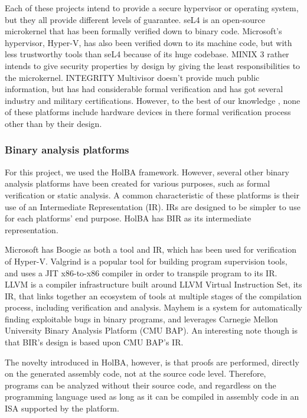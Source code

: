 \documentclass[10pt,a4paper]{article}
\begin{document}
\begin{multicols}{2}
Each of these projects intend to provide a secure hypervisor or operating system, but they all provide different levels of guarantee. seL4 is an open-source microkernel that has been formally verified down to binary code. Microsoft's hypervisor, Hyper-V, has also been verified down to its machine code, but with less trustworthy tools than seL4 because of its huge codebase. MINIX 3 rather intends to give security properties by design by giving the least responsibilities to the microkernel. INTEGRITY Multivisor doesn't provide much public information, but has had considerable formal verification and has got several industry and military certifications. However, to the best of our knowledge , none of these platforms include hardware devices in there formal verification process other than by their design.

\subsubsection{Binary analysis platforms}

For this project, we used the {HolBA} framework. However, several other binary analysis platforms have been created for various purposes, such as formal verification or static analysis. A common characteristic of these platforms is their use of an Intermediate Representation ({IR}). IRs are designed to be simpler to use for each platforms' end purpose. HolBA has BIR as its intermediate representation.

Microsoft has Boogie as both a tool and IR, which has been used for verification of {Hyper\nobreakdash-\hspace{0pt}V}. Valgrind is a popular tool for building program supervision tools, and uses a JIT x86-to-x86 compiler in order to transpile program to its IR. LLVM is a compiler infrastructure built around LLVM Virtual Instruction Set, its {IR}, that links together an ecosystem of tools at multiple stages of the compilation process, including verification and analysis. Mayhem is a system for automatically finding exploitable bugs in binary programs, and leverages Carnegie Mellon University Binary Analysis Platform (CMU BAP). An interesting note though is that BIR's design is based upon CMU BAP's IR.

The novelty introduced in HolBA, however, is that proofs are performed, directly on the generated assembly code, not at the source code level. Therefore, programs can be analyzed without their source code, and regardless on the programming language used as long as it can be compiled in assembly code in an {ISA} supported by the platform.


\end{multicols}
\end{document}

